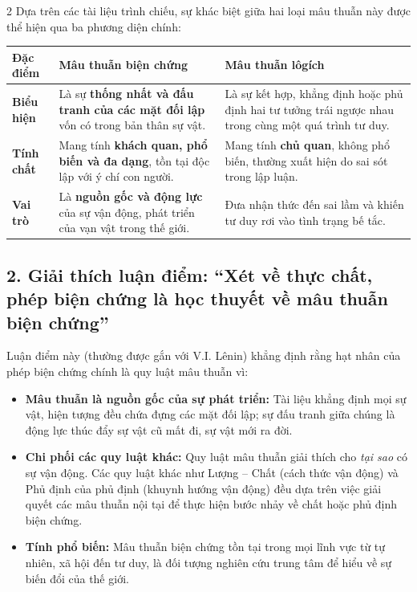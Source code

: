 \documentclass[9pt,a4paper]{extarticle}
\begin{document}
\begin{multicols*}{2}
Dựa trên các tài liệu trình chiếu, sự khác biệt giữa hai loại mâu thuẫn này được thể hiện qua ba phương diện chính:

\begin{center}
\renewcommand{\arraystretch}{1.2}
\begin{tabular}{|p{1.5cm}|p{3cm}|p{3cm}|}
\hline
\textbf{Đặc điểm} & \textbf{Mâu thuẫn biện chứng} & \textbf{Mâu thuẫn lôgích} \\
\hline
\textbf{Biểu hiện} & Là sự \textbf{thống nhất và đấu tranh của các mặt đối lập} vốn có trong bản thân sự vật. & Là sự kết hợp, khẳng định hoặc phủ định hai tư tưởng trái ngược nhau trong cùng một quá trình tư duy. \\
\hline
\textbf{Tính chất} & Mang tính \textbf{khách quan, phổ biến và đa dạng}, tồn tại độc lập với ý chí con người. & Mang tính \textbf{chủ quan}, không phổ biến, thường xuất hiện do sai sót trong lập luận. \\
\hline
\textbf{Vai trò} & Là \textbf{nguồn gốc và động lực} của sự vận động, phát triển của vạn vật trong thế giới. & Đưa nhận thức đến sai lầm và khiến tư duy rơi vào tình trạng bế tắc. \\
\hline
\end{tabular}
\end{center}

\subsection*{2. Giải thích luận điểm: ``Xét về thực chất, phép biện chứng là học thuyết về mâu thuẫn biện chứng''}

Luận điểm này (thường được gắn với V.I. Lênin) khẳng định rằng hạt nhân của phép biện chứng chính là quy luật mâu thuẫn vì:

\begin{itemize}
\item \textbf{Mâu thuẫn là nguồn gốc của sự phát triển:} Tài liệu khẳng định mọi sự vật, hiện tượng đều chứa đựng các mặt đối lập; sự đấu tranh giữa chúng là động lực thúc đẩy sự vật cũ mất đi, sự vật mới ra đời.
\item \textbf{Chi phối các quy luật khác:} Quy luật mâu thuẫn giải thích cho \textit{tại sao} có sự vận động. Các quy luật khác như Lượng -- Chất (cách thức vận động) và Phủ định của phủ định (khuynh hướng vận động) đều dựa trên việc giải quyết các mâu thuẫn nội tại để thực hiện bước nhảy về chất hoặc phủ định biện chứng.
\item \textbf{Tính phổ biến:} Mâu thuẫn biện chứng tồn tại trong mọi lĩnh vực từ tự nhiên, xã hội đến tư duy, là đối tượng nghiên cứu trung tâm để hiểu về sự biến đổi của thế giới.
\end{itemize}


\end{multicols*}
\end{document}
